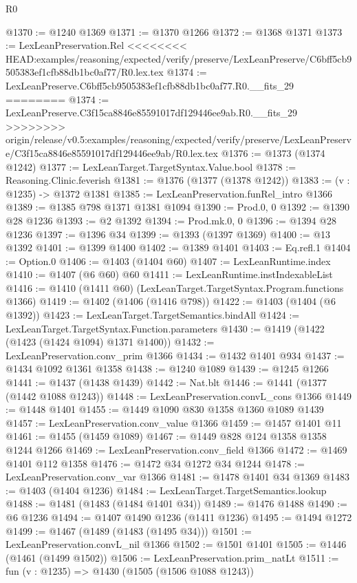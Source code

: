 \begin{lexlean}{R0}
\begin{coremodule}
{{{{{{{{{{{{{{{{{{{{{{{{{{{{{{{{{{{{{{{{{{{{{{{{{{{{{{{{{{{{{{{{{{{{{{{{{{{{{{{{{{{{{{@1370 := @1240 @1369
@1371 := @1370 @1266
@1372 := @1368 @1371
@1373 := LexLeanPreservation.Rel
<<<<<<<< HEAD:examples/reasoning/expected/verify/preserve/LexLeanPreserve/C6bff5cb9505383ef1cfb88db1bc0af77/R0.lex.tex
@1374 := LexLeanPreserve.C6bff5cb9505383ef1cfb88db1bc0af77.R0.__fits_29
========
@1374 := LexLeanPreserve.C3f15ca8846e85591017df129446ee9ab.R0.__fits_29
>>>>>>>> origin/release/v0.5:examples/reasoning/expected/verify/preserve/LexLeanPreserve/C3f15ca8846e85591017df129446ee9ab/R0.lex.tex
@1376 := @1373 (@1374 @1242)
@1377 := LexLeanTarget.TargetSyntax.Value.bool
@1378 := Reasoning.Clinic.feverish
@1381 := @1376 (@1377 (@1378 @1242))
@1383 := (v : @1235) -> @1372 @1381
@1385 := LexLeanPreservation.funRel_intro @1366
@1389 := @1385 @798 @1371 @1381 @1094
@1390 := Prod.{0, 0}
@1392 := @1390 @28 @1236
@1393 := @2 @1392
@1394 := Prod.mk.{0, 0}
@1396 := @1394 @28 @1236
@1397 := @1396 @34
@1399 := @1393 (@1397 @1369)
@1400 := @13 @1392
@1401 := @1399 @1400
@1402 := @1389 @1401
@1403 := Eq.refl.{1}
@1404 := Option.{0}
@1406 := @1403 (@1404 @60)
@1407 := LexLeanRuntime.index
@1410 := @1407 (@6 @60) @60
@1411 := LexLeanRuntime.instIndexableList
@1416 := @1410 (@1411 @60) (LexLeanTarget.TargetSyntax.Program.functions @1366)
@1419 := @1402 (@1406 (@1416 @798))
@1422 := @1403 (@1404 (@6 @1392))
@1423 := LexLeanTarget.TargetSemantics.bindAll
@1424 := LexLeanTarget.TargetSyntax.Function.parameters
@1430 := @1419 (@1422 (@1423 (@1424 @1094) @1371 @1400))
@1432 := LexLeanPreservation.conv_prim @1366
@1434 := @1432 @1401 @934
@1437 := @1434 @1092 @1361 @1358
@1438 := @1240 @1089
@1439 := @1245 @1266
@1441 := @1437 (@1438 @1439)
@1442 := Nat.blt
@1446 := @1441 (@1377 (@1442 @1088 @1243))
@1448 := LexLeanPreservation.convL_cons @1366
@1449 := @1448 @1401
@1455 := @1449 @1090 @830 @1358 @1360 @1089 @1439
@1457 := LexLeanPreservation.conv_value @1366
@1459 := @1457 @1401 @11
@1461 := @1455 (@1459 @1089)
@1467 := @1449 @828 @124 @1358 @1358 @1244 @1266
@1469 := LexLeanPreservation.conv_field @1366
@1472 := @1469 @1401 @112 @1358
@1476 := @1472 @34 @1272 @34 @1244
@1478 := LexLeanPreservation.conv_var @1366
@1481 := @1478 @1401 @34 @1369
@1483 := @1403 (@1404 @1236)
@1484 := LexLeanTarget.TargetSemantics.lookup
@1488 := @1481 (@1483 (@1484 @1401 @34))
@1489 := @1476 @1488
@1490 := @6 @1236
@1494 := @1407 @1490 @1236 (@1411 @1236)
@1495 := @1494 @1272
@1499 := @1467 (@1489 (@1483 (@1495 @34)))
@1501 := LexLeanPreservation.convL_nil @1366
@1502 := @1501 @1401
@1505 := @1446 (@1461 (@1499 @1502))
@1506 := LexLeanPreservation.prim_natLt
@1511 := fun (v : @1235) => @1430 (@1505 (@1506 @1088 @1243))
}}}}}}}}}}}}}}}}}}}}}}}}}}}}}}}}}}}}}}}}}}}}}}}}}}}}}}}}}}}}}}}}}}}}}}}}}}}}}}}}}}}}}}
\end{coremodule}
\end{lexlean}
